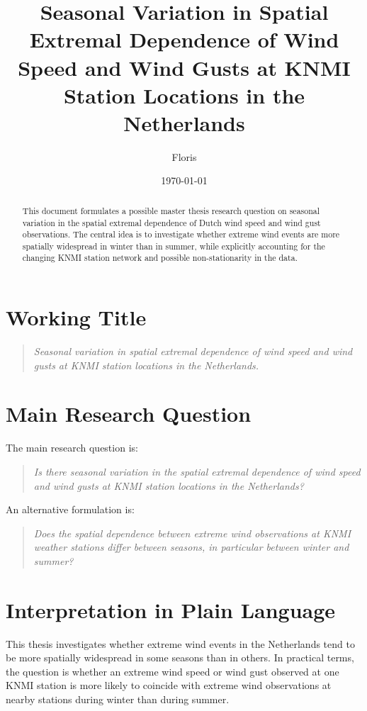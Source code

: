 \documentclass[11pt,a4paper]{article}
\title{Seasonal Variation in Spatial Extremal Dependence of Wind Speed and Wind Gusts at KNMI Station Locations in the Netherlands}
\author{Floris}
\date{\today}
\begin{document}
\maketitle

\begin{abstract}
    This document formulates a possible master thesis research question on seasonal variation in the spatial extremal dependence of Dutch wind speed and wind gust observations. The central idea is to investigate whether extreme wind events are more spatially widespread in winter than in summer, while explicitly accounting for the changing KNMI station network and possible non-stationarity in the data.
\end{abstract}

\section{Working Title}

\begin{quote}
    \emph{Seasonal variation in spatial extremal dependence of wind speed and wind gusts at KNMI station locations in the Netherlands.}
\end{quote}

\section{Main Research Question}

The main research question is:

\begin{quote}
    \emph{Is there seasonal variation in the spatial extremal dependence of wind speed and wind gusts at KNMI station locations in the Netherlands?}
\end{quote}

An alternative formulation is:

\begin{quote}
    \emph{Does the spatial dependence between extreme wind observations at KNMI weather stations differ between seasons, in particular between winter and summer?}
\end{quote}

\section{Interpretation in Plain Language}

This thesis investigates whether extreme wind events in the Netherlands tend to be more spatially widespread in some seasons than in others. In practical terms, the question is whether an extreme wind speed or wind gust observed at one KNMI station is more likely to coincide with extreme wind observations at nearby stations during winter than during summer.
\end{document}
